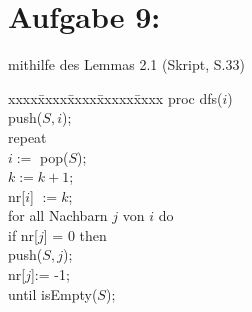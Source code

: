 \documentclass[11pt]{scrartcl} %
\begin{document}
\section*{Aufgabe 9:}
\begin{compactenum}[(a)]
	\item mithilfe des Lemmas 2.1 (Skript, S.33)\\
	\begin{minipage}[l]{10cm}
		\begin{tabbing}
		xxxx\= xxxx\= xxxx\= xxxxx\= xxxx \kill
		proc dfs($i$)\\
		\> push($S,i$);\\
		\> repeat\\
		\>\> $i:=$ pop($S$);\\
		\>\> $k:=k+1$;\\
		\>\> nr[$i$] $:=k$;\\
		\>\> for all Nachbarn $j$ von $i$ do\\
		\>\>\> if nr[$j$] = 0 then\\
		\>\>\>\> push($S,j$);\\
		\>\>\>\> nr[$j$]:= -1;\\
		\> until isEmpty($S$);
		\end{tabbing}
	\end{minipage}
\end{compactenum}
\end{document}
